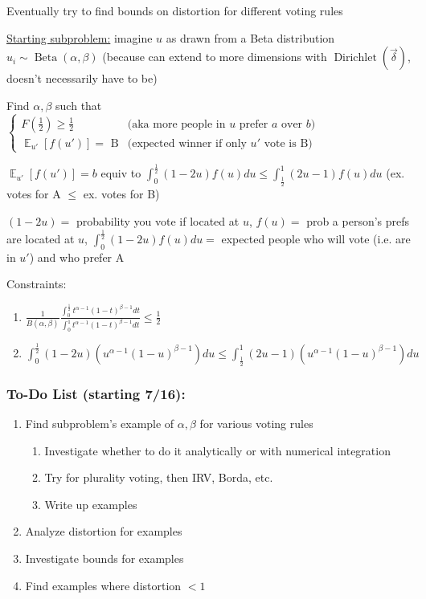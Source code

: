 \documentclass[12pt]{article}
\begin{document}
Eventually try to find bounds on distortion for different voting rules
\newline

\underline{Starting subproblem:} imagine $u$ as drawn from a Beta distribution $u_i \sim \operatorname{Beta}(\alpha, \beta)$ (because can extend to more dimensions with $\operatorname{Dirichlet}(\vec{\delta})$, doesn't necessarily have to be)

Find $\alpha, \beta$ such that $\begin{cases}
F(\frac{1}{2}) \geq \frac{1}{2} & \text{(aka more people in $u$ prefer $a$ over $b$)} \\
\mathop{\mathbb{E}}_{u'}[f(u')] = \text{ B} & \text{(expected winner if only $u'$ vote is B)}
\end{cases}$

$\mathop{\mathbb{E}}_{u'}[f(u')] = b$ equiv to $\int_0^{\frac{1}{2}} (1 - 2u) f(u) du \leq \int_{\frac{1}{2}}^1 (2u - 1)f(u)du$ (ex. votes for A $\leq$ ex. votes for B)

$(1 - 2u) =$ probability you vote if located at $u$, $f(u) =$ prob a person's prefs are located at $u$, $\int_0^{\frac{1}{2}} (1 - 2u) f(u) du =$ expected people who will vote (i.e. are in $u'$) and who prefer A
\newline

Constraints:
\begin{enumerate}[nolistsep]
    \setlength{\itemsep}{0pt}
    \setlength{\parskip}{0pt}
    \item $\frac{1}{B(\alpha, \beta)}\frac{\int_0^{\frac{1}{2}} t^{\alpha-1}(1-t)^{\beta-1}dt}{\int_0^1 t^{\alpha-1}(1-t)^{\beta-1}dt} \leq \frac{1}{2}$
    \item $\int_0^\frac{1}{2}(1-2u)(u^{\alpha-1}(1-u)^{\beta-1})du \leq \int_\frac{1}{2}^1(2u-1)(u^{\alpha-1}(1-u)^{\beta-1})du$
\end{enumerate}

\subsubsection*{To-Do List (starting 7/16):}
\begin{enumerate}
    \item Find subproblem's example of $\alpha, \beta$ for various voting rules
    \begin{enumerate}
        \item Investigate whether to do it analytically or with numerical integration
        \item Try for plurality voting, then IRV, Borda, etc.
        \item Write up examples
    \end{enumerate}
    \item Analyze distortion for examples
    \item Investigate bounds for examples
    \item Find examples where distortion $<1$
\end{enumerate}
\end{document}
